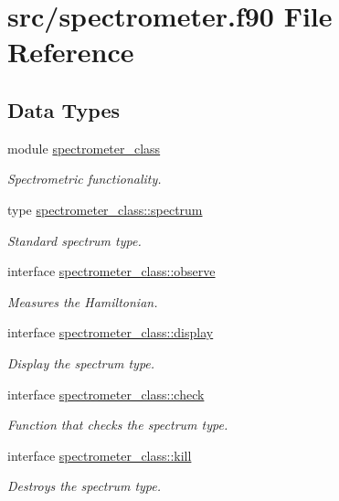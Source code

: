 \hypertarget{spectrometer_8f90}{\section{src/spectrometer.f90 File Reference}
\label{spectrometer_8f90}
}
\subsection*{Data Types}
\begin{DoxyCompactItemize}
\item 
module \hyperlink{classspectrometer__class}{spectrometer\-\_\-class}
\begin{DoxyCompactList}\small\item\em Spectrometric functionality. \end{DoxyCompactList}\item 
type \hyperlink{structspectrometer__class_1_1spectrum}{spectrometer\-\_\-class\-::spectrum}
\begin{DoxyCompactList}\small\item\em Standard spectrum type. \end{DoxyCompactList}\item 
interface \hyperlink{interfacespectrometer__class_1_1observe}{spectrometer\-\_\-class\-::observe}
\begin{DoxyCompactList}\small\item\em Measures the Hamiltonian. \end{DoxyCompactList}\item 
interface \hyperlink{interfacespectrometer__class_1_1display}{spectrometer\-\_\-class\-::display}
\begin{DoxyCompactList}\small\item\em Display the spectrum type. \end{DoxyCompactList}\item 
interface \hyperlink{interfacespectrometer__class_1_1check}{spectrometer\-\_\-class\-::check}
\begin{DoxyCompactList}\small\item\em Function that checks the spectrum type. \end{DoxyCompactList}\item 
interface \hyperlink{interfacespectrometer__class_1_1kill}{spectrometer\-\_\-class\-::kill}
\begin{DoxyCompactList}\small\item\em Destroys the spectrum type. \end{DoxyCompactList}\end{DoxyCompactItemize}
